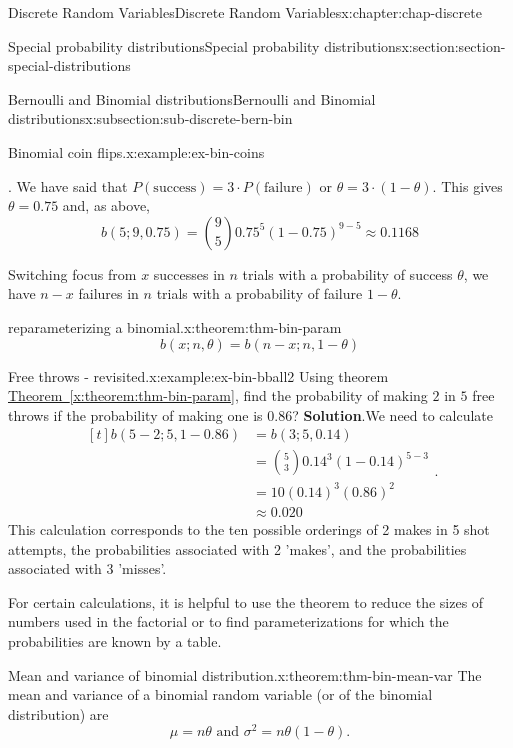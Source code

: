 \documentclass[oneside,10pt,]{book}
\newcommand{\blocktitlefont}{\relax}
\newcommand{\xreffont}{\relax}
\numberwithin{equation}{section}
\newcommand{\amp}{&}
\begin{document}
\begin{chapterptx}{Discrete Random Variables}{}{Discrete Random Variables}{}{}{x:chapter:chap-discrete}
\begin{sectionptx}{Special probability distributions}{}{Special probability distributions}{}{}{x:section:section-special-distributions}
\begin{subsectionptx}{Bernoulli and Binomial distributions}{}{Bernoulli and Binomial distributions}{}{}{x:subsection:sub-discrete-bern-bin}
\begin{example}{Binomial coin flips.}{x:example:ex-bin-coins}
\begin{enumerate}
\theta\). We have said that \(P(\text{success}) = 3\cdot P(\text{failure})\) or \(\theta = 3\cdot (1-\theta)\). This gives \(\theta = 0.75\) and, as above,%
\begin{equation*}
b(5; 9, 0.75) = {9
\choose 5}0.75^5(1-0.75)^{9-5} \approx 0.1168 
\end{equation*}
%
\end{enumerate}
\end{example}
Switching focus from \(x\) successes in \(n\) trials with a probability of success \(\theta\), we have \(n-x\) failures in \(n\) trials with a probability of failure \(1-\theta\).%
\begin{theorem}{reparameterizing a binomial.}{}{x:theorem:thm-bin-param}%
%
\begin{equation*}
b(x; n, \theta) = b(n-x; n, 1-\theta)
\end{equation*}
%
\end{theorem}
\begin{example}{Free throws - revisited.}{x:example:ex-bin-bball2}%
Using theorem \hyperref[x:theorem:thm-bin-param]{Theorem~{\xreffont\ref{x:theorem:thm-bin-param}}}, find the probability of making \(2\) in \(5\) free throws if the probability of making one is \(0.86\)?%
\textbf{\blocktitlefont Solution}.\quad{}We need to calculate%
\begin{equation*}
\begin{aligned}[t]
b(5-2; 5, 1-0.86) \amp = b(3; 5, 0.14)\\
\amp = {5\choose3}0.14^3(1-0.14)^{5-3}\\
\amp = 10(0.14)^3(0.86)^2\\
\amp \approx 0.020
\end{aligned}\text{.}
\end{equation*}
This calculation corresponds to the ten possible orderings of 2 makes in 5 shot attempts, the probabilities associated with 2 'makes', and the probabilities associated with 3 'misses'.%
\end{example}
For certain calculations, it is helpful to use the theorem to reduce the sizes of numbers used in the factorial or to find parameterizations for which the probabilities are known by a table.%
\begin{theorem}{Mean and variance of binomial distribution.}{}{x:theorem:thm-bin-mean-var}%
The mean and variance of a binomial random variable (or of the binomial distribution) are%
\begin{equation*}
\mu = n\theta \text{ and } \sigma^2 =
n\theta(1-\theta)\text{.}
\end{equation*}

\end{theorem}
\end{subsectionptx}
\end{sectionptx}
\end{chapterptx}
\end{document}
